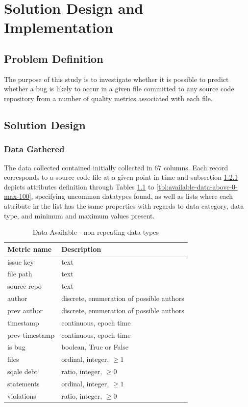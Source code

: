 \chapter{Solution Design and Implementation}\label{chp:design-and-impl}

\section{Problem Definition}
The purpose of this study is to investigate whether it is possible to predict whether a bug is likely to occur in a given file committed to any source code repository from a number of quality metrics associated with each file. 

\section{Solution Design}\label{sec:design}
\subsection{Data Gathered}\label{sec:data-available}
The data collected contained \totalRows{} initially collected in 67 columns. Each record corresponds to a source code file at a given point in time and subsection \ref{sec:data-available} depicts attributes definition through Tables \ref{tbl:available-data-non-repeating-types} to \ref{tbl:available-data-above-0-max-100}, specifying uncommon datatypes found, as well as lists where each attribute in the list has the same properties with regards to data category, data type, and minimum and maximum values present. 

\begin{table}[h!]
\caption{Data Available - non repeating data types}
\label{tbl:available-data-non-repeating-types}
\begin{tabular}{@{}ll@{}}
\toprule
Metric name & Description \\ \midrule
issue key & text \\ 
file path & text \\
source repo & text \\
author & discrete, enumeration of possible authors \\
prev author & discrete, enumeration of possible authors\\
timestamp & continuous, epoch time \\
prev timestamp & continuous, epoch time \\
is bug & boolean, True or False \\
files & ordinal, integer, $\geq{}1$ \\
sqale debt & ratio, integer, $\geq{}0$ \\
statements & ordinal, integer, $\geq{}1$ \\
violations & ratio, integer, $\geq{}0$ \\ \bottomrule
\end{tabular}
\end{table}

